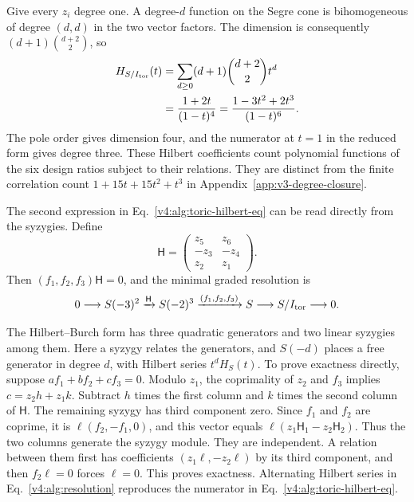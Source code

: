 \documentclass[aps,pre,reprint,amsmath,amssymb,longbibliography]{revtex4-2}
\begin{document}
Give every $z_i$ degree one. A degree-$d$ function on the Segre cone is
bihomogeneous of degree $(d,d)$ in the two vector factors. The dimension
is consequently $(d+1)\binom{d+2}{2}$, so
\begin{equation}
 \begin{aligned}
 H_{S/I_{\rm tor}}(t)&=
 \sum_{d\ge0}(d+1)\binom{d+2}{2}t^d\\
 &=\frac{1+2t}{(1-t)^4}
 =\frac{1-3t^2+2t^3}{(1-t)^6}.
 \end{aligned}
 \label{v4:alg:toric-hilbert-eq}
\end{equation}
The pole order gives dimension four, and the numerator at $t=1$ in
the reduced form gives degree three. These Hilbert coefficients count
polynomial functions of the six design ratios subject to their relations.
They are distinct from the finite correlation count
$1+15t+15t^2+t^3$ in Appendix~\ref{app:v3-degree-closure}.

The second expression in Eq.~\eqref{v4:alg:toric-hilbert-eq} can be read
directly from the syzygies. Define
\begin{equation}
 \mathsf H=
 \begin{pmatrix}z_5&z_6\\-z_3&-z_4\\z_2&z_1\end{pmatrix}.
 \label{v4:alg:hilbert-burch}
\end{equation}
Then $(f_1,f_2,f_3)\mathsf H=0$, and the minimal graded resolution is
\begin{equation}
 0\longrightarrow S(-3)^2\xrightarrow{\mathsf H}S(-2)^3
 \xrightarrow{(f_1,f_2,f_3)}S\longrightarrow S/I_{\rm tor}
 \longrightarrow0.
 \label{v4:alg:resolution}
\end{equation}

The Hilbert--Burch form has three quadratic generators and two
linear syzygies among them.  Here a syzygy relates the generators, and $S(-d)$ places a free
generator in degree $d$, with Hilbert series $t^dH_S(t)$. To prove
exactness directly, suppose
$a f_1+b f_2+c f_3=0$. Modulo $z_1$, the coprimality of $z_2$ and
$f_3$ implies $c=z_2h+z_1k$. Subtract $h$ times the first column and
$k$ times the second column of $\mathsf H$. The remaining syzygy has
third component zero. Since $f_1$ and $f_2$ are coprime, it is
$\ell(f_2,-f_1,0)$, and this vector equals
$\ell(z_1\mathsf H_1-z_2\mathsf H_2)$. Thus the two columns generate
the syzygy module. They are independent.  A relation between them first
has coefficients $(z_1\ell,-z_2\ell)$ by its third component, and then
$f_2\ell=0$ forces $\ell=0$. This proves exactness. Alternating Hilbert
series in Eq.~\eqref{v4:alg:resolution} reproduces the numerator in
Eq.~\eqref{v4:alg:toric-hilbert-eq}.
\end{document}

